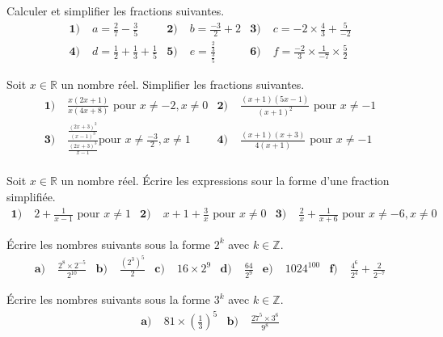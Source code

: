 \documentclass[11pt]{article}
\begin{document}
\begin{exo}
Calculer et simplifier les fractions suivantes.
\begin{align*}
  \textbf{1)}\;& a=\frac{2}{7}-\frac{3}{5} &
  \textbf{2)}\;& b=\frac{-3}{2}+2 &
  \textbf{3)}\;& c=-2\times\frac{4}{3}+\frac{5}{-2} \\
  \textbf{4)}\;& d=\frac{1}{2}+\frac{1}{3}+\frac{1}{5} &
  \textbf{5)}\;& e= \frac{\frac{2}{3}}{\frac{3}{5}} &
  \textbf{6)}\;& f= \frac{-2}{3}\times\frac{1}{-7}\times\frac{5}{2}
\end{align*}
\end{exo}

\begin{exo}
Soit $x\in\mathbb{R}$ un nombre réel. Simplifier
les fractions suivantes.
\begin{align*}
  \textbf{1)}\;& \frac{x(2x+1)}{x(4x+8)}\text{ pour } x\neq-2, x\neq0 &
  \textbf{2)}\;& \frac{(x+1)(5x-1)}{(x+1)^2}\text{ pour } x\neq-1 \\
  \textbf{3)}\;& \frac{\frac{(2x+3)^2}{(x-1)^3}}{\frac{(2x+3)^3}{x-1}}\text{
  pour } x\neq\frac{-3}{2}, x\neq1 &
  \textbf{4)}\;& \frac{(x+1)(x+3)}{4(x+1)}\text{ pour } x\neq-1 \\
\end{align*}
\end{exo}

\begin{exo}
Soit $x\in\mathbb{R}$ un nombre réel. Écrire les
expressions sour la forme d'une fraction simplifiée.
\begin{align*}
  \textbf{1)}\; & 2+\frac{1}{x-1}\text{ pour }x\neq1 &
  \textbf{2)}\; & x+1+\frac{3}{x}\text{ pour }x\neq0 &
  \textbf{3)}\; & \frac{2}{x}+\frac{1}{x+6}\text{ pour }x\neq-6, x\neq0 &
\end{align*}
\end{exo}

\begin{exo}
Écrire les nombres suivants sous la forme $2^k$ avec
$k\in\mathbb{Z}$.
\begin{align*}
  \textbf{a)}\;&\frac{2^8\times2^{-5}}{2^{10}} &
  \textbf{b)}\;&\frac{(2^3)^5}{2} &
  \textbf{c)}\;&16\times2^9 &
  \textbf{d)}\;&\frac{64}{2^9} &
  \textbf{e)}\;&1024^{100} &
  \textbf{f)}\;&\frac{4^6}{2^4}+\frac{2}{2^{-7}}
\end{align*}
\end{exo}

\begin{exo}
Écrire les nombres suivants sous la forme $3^k$ avec
$k\in\mathbb{Z}$.
\begin{align*}
  \textbf{a)}\;& 81\times\left( \frac{1}{3} \right)^5 &
  \textbf{b)}\;& \frac{27^5\times3^6}{9^8}
\end{align*}
\end{exo}
\end{document}
